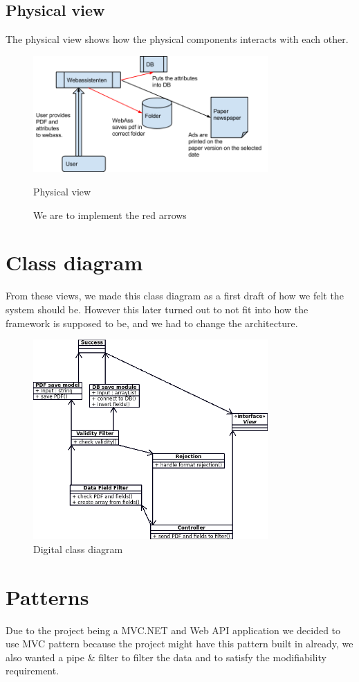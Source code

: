 \subsection{Physical view}
The physical view shows how the physical components interacts with each other.
\begin{figure}[H]
\centering
\includegraphics[width=0.8\textwidth]{images/architecture02.png}
\caption{Physical view}
\caption*{We are to implement the red arrows}
\label{fig:physical_view}
\end{figure}
\newpage
\section{Class diagram}
From these views, we made this class diagram as a first draft of how we felt the system should be. However this later turned out to not fit into how the framework is supposed to be, and we had to change the architecture.
\begin{figure}[H]
\centering
\includegraphics[width=0.8\textwidth]{diagrams/class_diagram.png}
\caption{Digital class diagram}
\label{fig:class_diagram}
\end{figure}
\section{Patterns}
Due to the project being a MVC.NET and Web API application we decided to use MVC pattern because the project might have this pattern built in already, we also wanted a pipe \& filter to filter the data and to satisfy the modifiability requirement.

